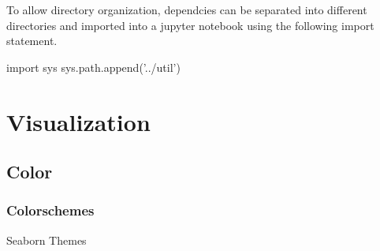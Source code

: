 \documentclass[]{book}
\newenvironment{Shaded}{\begin{snugshade}}{\end{snugshade}}
\newcommand{\StringTok}[1]{\textcolor[rgb]{0.31,0.60,0.02}{#1}}
\newcommand{\ImportTok}[1]{#1}
\newcommand{\NormalTok}[1]{#1}
\begin{document}
To allow directory organization, dependcies can be separated into
different directories and imported into a jupyter notebook using the
following import statement.

\begin{Shaded}
\begin{Highlighting}[]
\ImportTok{import}\NormalTok{ sys}
\NormalTok{sys.path.append(}\StringTok{'../util'}\NormalTok{)}
\end{Highlighting}
\end{Shaded}

\chapter{Visualization}\label{visualization}

\section{Color}\label{color}

\subsection{Colorschemes}\label{colorschemes}

Seaborn Themes

\begin{Shaded}
\end{Shaded}

\begin{Shaded}
\end{Shaded}
\end{document}
